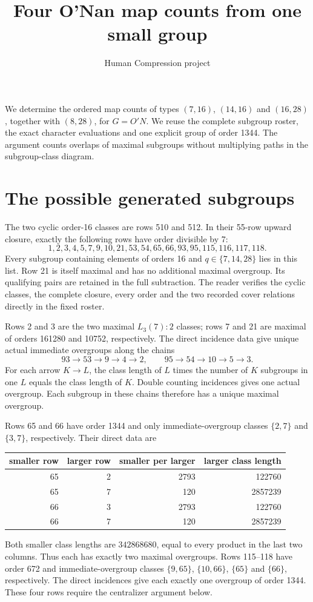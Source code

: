 \documentclass[11pt,a4paper]{article}
\title{Four O'Nan map counts from one small group}
\author{Human Compression project}\date{}
\begin{document}
\maketitle
We determine the ordered map counts of types $(7,16)$, $(14,16)$
and $(16,28)$, together with $(8,28)$, for $G=O'N$. We reuse the complete subgroup roster,
the exact character evaluations and one explicit group of order 1344.
The argument counts overlaps of maximal subgroups without multiplying
paths in the subgroup-class diagram.

\section{The possible generated subgroups}
The two cyclic order-16 classes are rows 510 and 512. In their
55-row upward closure, exactly the following rows have order divisible by 7:
\[
1,2,3,4,5,7,9,10,21,53,54,65,66,93,95,115,116,117,118.
\]
Every subgroup containing elements of orders 16 and $q\in\{7,14,28\}$
lies in this list. Row 21 is itself maximal and has no additional
maximal overgroup. Its qualifying pairs are retained in the full subtraction.
The reader verifies the cyclic classes, the complete closure, every order
and the two recorded cover relations directly in the fixed roster.

Rows 2 and 3 are the two maximal $L_3(7):2$ classes; rows 7 and 21
are maximal of orders 161280 and 10752, respectively. The direct incidence data give unique actual immediate
overgroups along the chains
\[
93\longrightarrow53\longrightarrow9\longrightarrow4\longrightarrow2,
\qquad95\longrightarrow54\longrightarrow10\longrightarrow5\longrightarrow3.
\]
For each arrow $K\to L$, the class length of $L$ times the number of
$K$ subgroups in one $L$ equals the class length of $K$. Double counting
incidences gives one actual overgroup. Each subgroup in these chains
therefore has a unique maximal overgroup.

Rows 65 and 66 have order 1344 and only immediate-overgroup classes
$\{2,7\}$ and $\{3,7\}$, respectively. Their direct data are
\begin{center}\begin{tabular}{rrrr}\toprule
smaller row&larger row&smaller per larger&larger class length\\\midrule
65&2&2793&122760\\65&7&120&2857239\\
66&3&2793&122760\\66&7&120&2857239\\\bottomrule
\end{tabular}\end{center}
Both smaller class lengths are $342868680$, equal to every product
in the last two columns. Thus each has exactly two maximal overgroups.
Rows 115--118 have order 672 and immediate-overgroup classes
$\{9,65\}$, $\{10,66\}$, $\{65\}$ and $\{66\}$, respectively.
The direct incidences give each exactly one overgroup of order 1344.
These four rows require the centralizer argument below.
\end{document}
